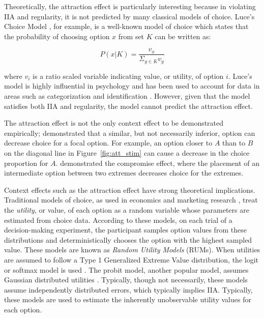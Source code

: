 Theoretically, the attraction effect is particularly interesting because in violating IIA and regularity, it is not predicted by many classical models of choice. Luce's Choice Model \parencite{luce1959individual}, for example, is a well-known model of choice which states that the probability of choosing option $x$ from set $K$ can be written as:

\begin{equation}
    P(x|K)=\frac{v_{x}}{\Sigma_{y \in K}v_{y}}
\end{equation}

where $v_{i}$ is a ratio scaled variable indicating value, or utility, of option $i$. Luce's model is highly influential in psychology and has been used to account for data in areas such as categorization \parencite{nosofskyAttentionSimilarityIdentificationCategorization1986} and identification \parencite{townsend1971theoretical}. However, given that the model satisfies both IIA and regularity, the model cannot predict the attraction effect. 

The attraction effect is not the only context effect to be demonstrated empirically; \textcite{tverskyEliminationAspectsTheory1972} demonstrated that a similar, but not necessarily inferior, option can decrease choice for a focal option. For example, an option closer to $A$ than to $B$ on the diagonal line in Figure~\ref{fig:att_stim} can cause a decrease in the choice proportion for $A$. \textcite{simonsonChoiceBasedReasons1989b} demonstrated the compromise effect, where the placement of an intermediate option between two extremes decreases choice for the extremes. 

Context effects such as the attraction effect have strong theoretical implications. Traditional models of choice, as used in economics and marketing research \parencite{mcfadden2001economic}, treat the \textit{utility}, or value, of each option as a random variable whose parameters are estimated from choice data. According to these models, on each trial of a decision-making experiment, the participant samples option values from these distributions and deterministically chooses the option with the highest sampled value. These models are known as \textit{Random Utility Models} (RUMs). When utilities are assumed to follow a Type 1 Generalized Extreme Value distribution, the logit or softmax model is used \parencite{gensch1979multinomial}. The probit model, another popular model, assumes Gaussian distributed utilities \parencite{bolduc1999practical}. Typically, though not necessarily, these models assume independently distributed errors, which typically implies IIA. Typically, these models are used to estimate the inherently unobservable utility values for each option. 

